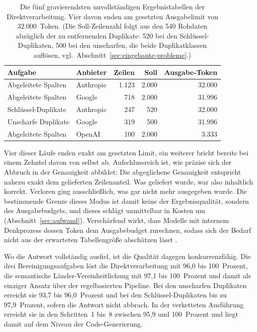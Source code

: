 \begin{table}[H]
    \centering
    \small
    \caption[Unvollständige Ergebnistabellen im Direkt-Modus]{Die fünf gravierendsten unvollständigen Ergebnistabellen der Direktverarbeitung. Vier davon enden am gesetzten Ausgabelimit von 32.000~Token. (Die Soll-Zeilenzahl folgt aus den 540 Rohdaten abzüglich der zu entfernenden Duplikate: 520 bei den Schlüssel-Duplikaten, 500 bei den unscharfen, die beide Duplikatklassen auflösen, vgl.\ Abschnitt~\ref{sec:eingebaute-probleme}.)}
    \label{tab:direkt-abbrueche}
    \begin{tabular}{@{}llrrr@{}}
        \toprule
        \textbf{Aufgabe} & \textbf{Anbieter} & \textbf{Zeilen} & \textbf{Soll} & \textbf{Ausgabe-Token} \\
        \midrule
        Abgeleitete Spalten & Anthropic & 1.123 & 2.000 & 32.000 \\
        Abgeleitete Spalten & Google & 718 & 2.000 & 31.996 \\
        Schlüssel-Duplikate & Anthropic & 247 & 520 & 32.000 \\
        Unscharfe Duplikate & Google & 319 & 500 & 31.996 \\
        \addlinespace
        Abgeleitete Spalten & OpenAI & 100 & 2.000 & 3.333 \\
        \bottomrule
    \end{tabular}
\end{table}

Vier dieser Läufe enden exakt am gesetzten Limit, ein weiterer bricht bereits bei einem Zehntel davon von selbst ab. Aufschlussreich ist, wie präzise sich der Abbruch in der Genauigkeit abbildet: Die abgeglichene Genauigkeit entspricht nahezu exakt dem gelieferten Zeilenanteil. Was geliefert wurde, war also inhaltlich korrekt. Verloren ging ausschließlich, was gar nicht mehr ausgegeben wurde. Die bestimmende Grenze dieses Modus ist damit keine der Ergebnisqualität, sondern des Ausgabebudgets, und dieses schlägt unmittelbar in Kosten um (Abschnitt~\ref{sec:aufwand}). Verschärfend wirkt, dass Modelle mit internem Denkprozess dessen Token dem Ausgabebudget zurechnen, sodass sich der Bedarf nicht aus der erwarteten Tabellengröße abschätzen lässt \autocite{changEfficientPromptingMethods2024,2026AIIndex}.

Wo die Antwort vollständig ausfiel, ist die Qualität dagegen konkurrenzfähig. Die drei Bereinigungsaufgaben löst die Direktverarbeitung mit 96,0 bis 100~Prozent, die semantische Länder-Vereinheitlichung mit 97,1 bis 100~Prozent und damit als einziger Ansatz über der regelbasierten Pipeline. Bei den unscharfen Duplikaten erreicht sie 93,7 bis 96,0~Prozent und bei den Schlüssel-Duplikaten bis zu 97,9~Prozent, sofern die Antwort nicht abbrach. In der verketteten Ausführung erreicht sie in den Schritten~1 bis~8 zwischen 95,9 und 100~Prozent und liegt damit auf dem Niveau der Code-Generierung.

